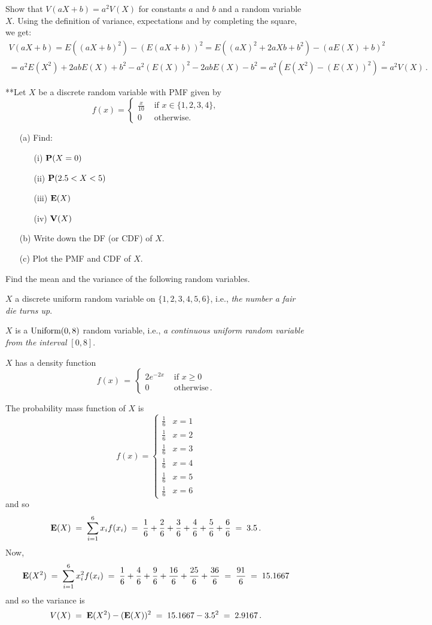 \begin{ExerciseList}
\Exercise
Show that $V(aX+b) = a^2 V(X)$ for constants $a$ and $b$ and a random variable $X$.
\Answer
Using the definition of variance, expectations and by completing the square, we get:
\begin{multline*}
V(aX+b) = E ((aX+b)^2) - (E(aX+b))^2 = E \left( (aX)^2 + 2aXb + b^2 \right) - \left( aE(X)+b\right)^2 \\
= a^2 E \left(X^2\right) + 2ab E(X) + b^2 - a^2(E(X))^2 - 2abE(X) - b^2
= a^2 \left( E \left(X^2\right) - (E(X))^2 \right) = a^2 V(X) \, .
\end{multline*}

\Exercise
{**}Let $X$ be a discrete random variable with PMF given by
\[
f(x) = 
\begin{cases}
\frac{x}{10} & \text{ if } x \in \{1,2,3,4\} ,\\
0 & \text{ otherwise.}
\end{cases}
\]
\begin{itemize}
\item[(a)] Find:
\begin{itemize}
\item[(i)] $\mathbf{P}(X=0)$
\item[(ii)] $\mathbf{P}(2.5 < X < 5)$
\item[(iii)] $\mathbf{E}(X)$
\item[(iv)] $\mathbf{V}(X)$
\end{itemize}
\item[(b)] Write down the DF (or CDF) of $X$.
\item[(c)] Plot the PMF and CDF of $X$.
\end{itemize}

\Exercise
Find the mean and the variance of the following  random variables.
\be
\item $X$ a discrete uniform random variable on $\{1,2,3,4,5,6\}$, i.e., \textit{the number a fair die turns up}.
 \item $X$ is a $\mbox{{\rm Uniform}}(0,8)$ random variable, i.e., \textit{a continuous uniform random variable from the interval} $[0,8]$.

\item $X$ has a density function
$$
f(x)\,=\, 
\begin{cases} 
2e^{-2x} & \text{ if }  x \geq 0\\ 
0 & \text{ otherwise} \, . 
\end{cases}
$$
\ee
\Answer
\be
\item
The probability mass function of $X$ is
$$f(x)=\begin{cases}\frac{1}{6}&x=1\\
\frac{1}{6}&x=2\\
\frac{1}{6}&x=3\\
\frac{1}{6}&x=4\\
\frac{1}{6}&x=5\\
\frac{1}{6}&x=6
\end{cases}$$
and so
$$\mathbf{E}(X)\;=\;\sum_{i=1}^6
x_if(x_i)\;=\;\frac{1}{6}+\frac{2}{6}+\frac{3}{6}+\frac{4}{6}+\frac{5}{6}+\frac{6}{6}\;=\;3.5\,.$$
Now,
$$\mathbf{E}(X^2)\;=\;\sum_{i=1}^6 x^2_if(x_i)\;=\;\frac{1}{6}+\frac{4}{6}+\frac{9}{6}+\frac{16}{6}+\frac{25}{6}+\frac{36}{6}\;=\;\frac{91}{6}\;=\;15.1667$$
and so  the variance is
\[V(X)\; =\; \mathbf{E}(X^2) - (\mathbf{E}(X))^2 \;=\; 15.1667-3.5^2\;=\;2.9167\,.\] 
  

\end{ExerciseList}
